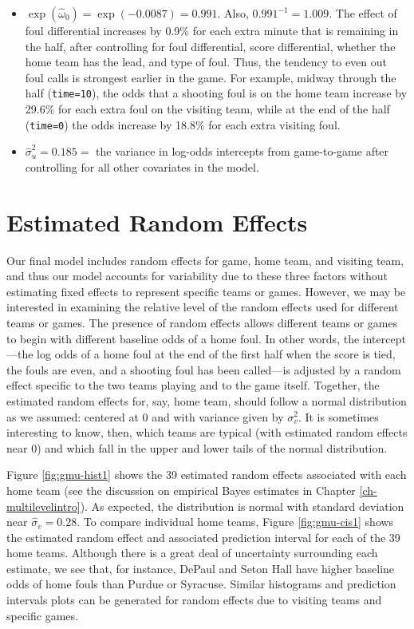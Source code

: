 \documentclass[
]{krantz}
\begin{document}
\begin{itemize}
\item
  \(\exp(\hat{\omega}_{0})=\exp(-0.0087)=0.991\). Also, \(0.991^{-1}=1.009\). The effect of foul differential increases by 0.9\% for each extra minute that is remaining in the half, after controlling for foul differential, score differential, whether the home team has the lead, and type of foul. Thus, the tendency to even out foul calls is strongest earlier in the game. For example, midway through the half (\texttt{time=10}), the odds that a shooting foul is on the home team increase by 29.6\% for each extra foul on the visiting team, while at the end of the half (\texttt{time=0}) the odds increase by 18.8\% for each extra visiting foul.
\item
  \(\hat{\sigma}_{u}^{2}=0.185=\) the variance in log-odds intercepts from game-to-game after controlling for all other covariates in the model.
\end{itemize}

\hypertarget{estimatedRE}{%
\section{Estimated Random Effects}\label{estimatedRE}}

Our final model includes random effects for game, home team, and visiting team, and thus our model accounts for variability due to these three factors without estimating fixed effects to represent specific teams or games. However, we may be interested in examining the relative level of the random effects used for different teams or games. The presence of random effects allows different teams or games to begin with different baseline odds of a home foul. In other words, the intercept---the log odds of a home foul at the end of the first half when the score is tied, the fouls are even, and a shooting foul has been called---is adjusted by a random effect specific to the two teams playing and to the game itself. Together, the estimated random effects for, say, home team, should follow a normal distribution as we assumed: centered at 0 and with variance given by \(\sigma_{v}^{2}\). It is sometimes interesting to know, then, which teams are typical (with estimated random effects near 0) and which fall in the upper and lower tails of the normal distribution.

Figure \ref{fig:gmu-hist1} shows the 39 estimated random effects associated with each home team (see the discussion on empirical Bayes estimates  in Chapter \ref{ch-multilevelintro}). As expected, the distribution is normal with standard deviation near \(\hat{\sigma}_{v}=0.28\). To compare individual home teams, Figure \ref{fig:gmu-cis1} shows the estimated random effect and associated prediction interval for each of the 39 home teams. Although there is a great deal of uncertainty surrounding each estimate, we see that, for instance, DePaul and Seton Hall have higher baseline odds of home fouls than Purdue or Syracuse. Similar histograms and prediction intervals plots can be generated for random effects due to visiting teams and specific games.
\end{document}
